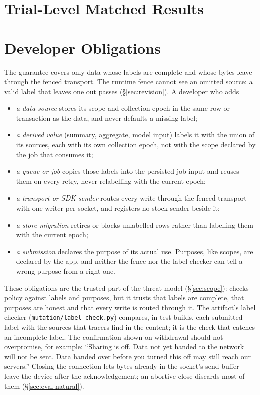 

\section{Trial-Level Matched Results}
\label{app:matched-trials}


\section{Developer Obligations}
\label{app:obligations}
The guarantee covers only data whose labels are complete and whose bytes leave through the fenced transport. The runtime
fence cannot see an omitted source: a valid label that leaves one out passes (\S\ref{sec:revision}). A developer who adds
\begin{itemize}[leftmargin=*,nosep]
\item \emph{a data source} stores its scope and collection epoch in the same row or transaction as the data, and never
defaults a missing label;
\item \emph{a derived value} (summary, aggregate, model input) labels it with the union of its sources, each with its own
collection epoch, not with the scope declared by the job that consumes it;
\item \emph{a queue or job} copies those labels into the persisted job input and reuses them on every retry, never
relabelling with the current epoch;
\item \emph{a transport or SDK sender} routes every write through the fenced transport with one writer per socket, and
registers no stock sender beside it;
\item \emph{a store migration} retires or blocks unlabelled rows rather than labelling them with the current epoch;
\item \emph{a submission} declares the purpose of its actual use. Purposes, like scopes, are declared by the app, and
neither the fence nor the label checker can tell a wrong purpose from a right one.
\end{itemize}
These obligations are the trusted part of the threat model (\S\ref{sec:scope}): \sys checks policy against labels and
purposes, but it trusts that labels are complete, that purposes are honest and that every write is routed through it.
The artifact's label checker (\texttt{mutation/label\_check.py}) compares, in test builds, each submitted label with the
sources that tracers find in the content; it is the check that catches an incomplete label. The confirmation shown on
withdrawal should not overpromise, for example: ``Sharing is off. Data not yet handed to the network will not be sent. Data handed over before
you turned this off may still reach our servers.'' Closing the connection lets bytes already in the socket's send
buffer leave the device after the acknowledgement; an abortive close discards most of them (\S\ref{sec:eval-natural}).

